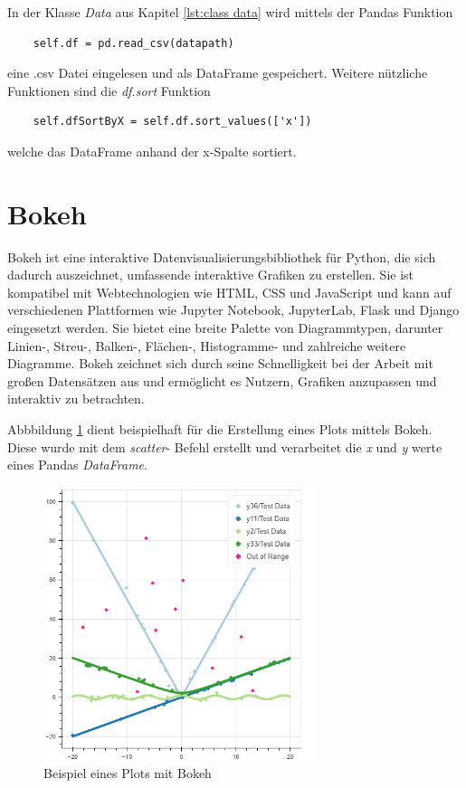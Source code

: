  In der Klasse \textit{Data} aus Kapitel \ref{lst:class data} wird mittels der Pandas Funktion
 \begin{lstlisting}
 	self.df = pd.read_csv(datapath)
 \end{lstlisting}
 eine .csv Datei eingelesen und als DataFrame gespeichert. 
 Weitere nützliche Funktionen sind die \textit{df.sort} Funktion
 \begin{lstlisting}
 	self.dfSortByX = self.df.sort_values(['x'])
 \end{lstlisting}
 welche das DataFrame anhand der x-Spalte sortiert.
 
 \section{Bokeh}
 Bokeh ist eine interaktive Datenvisualisierungsbibliothek für Python, die sich dadurch auszeichnet, umfassende interaktive Grafiken zu erstellen. Sie ist kompatibel mit Webtechnologien wie HTML, CSS und JavaScript und kann auf verschiedenen Plattformen wie Jupyter Notebook, JupyterLab, Flask und Django eingesetzt werden.
 Sie bietet eine breite Palette von Diagrammtypen, darunter Linien-, Streu-, Balken-, Flächen-, Histogramme- und zahlreiche weitere Diagramme. Bokeh zeichnet sich durch seine Schnelligkeit bei der Arbeit mit großen Datensätzen aus und ermöglicht es Nutzern, Grafiken anzupassen und interaktiv zu betrachten. 
 
Abbbildung \ref{fig:bokeh} dient beispielhaft für die Erstellung eines Plots mittels Bokeh. Diese wurde mit dem \textit{scatter}- Befehl erstellt und verarbeitet die \textit{x} und \textit{y} werte eines Pandas \textit{DataFrame}.
 \begin{figure}[h]
 	\centering
 	\includegraphics[width=8cm]{pics/bokeh_plot.png}
 	\caption{Beispiel eines Plots mit Bokeh }
 	\label{fig:bokeh}
 \end{figure} 
 
